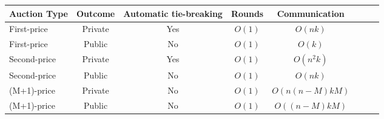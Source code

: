 \documentclass[letterpaper,11pt]{article}
\begin{document}
\begin{center}
\begin{tabular}{l*{6}{c}r}
	Auction Type	& Outcome 	& Automatic tie-breaking 	& Rounds 	& Communication\\
	\hline
	First-price 	& Private	& Yes						& $O(1)$	& $O(nk)$\\
	First-price		& Public	& No						& $O(1)$	& $O(k)$\\
	Second-price	& Private	& Yes						& $O(1)$	& $O(n^2k)$\\
	Second-price    & Public	& No						& $O(1)$	& $O(nk)$\\
	(M+1)-price    	& Private	& No						& $O(1)$	& $O(n(n-M)kM)$\\
	(M+1)-price    	& Public	& No						& $O(1)$	& $O((n-M)kM)$\\
\end{tabular}
\end{center}
\end{document}
